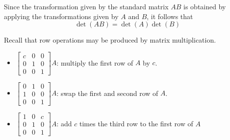 \begin{applicationActivities}
\begin{activity}{5}
\end{activity}

\begin{fact}
Since the transformation given by the standard matrix \(AB\) is obtained
by applying the transformations given by \(A\) and \(B\), it follows that 
\[\det(AB)=\det(A)\det(B)\]
\end{fact}

\begin{remark}
Recall that row operations may be produced by matrix multiplication.
\begin{itemize}
\item \(
  \begin{bmatrix}
  c & 0 & 0 \\
  0 & 1 & 0 \\
  0 & 0 & 1
  \end{bmatrix}A
\): multiply the first row of \(A\) by \(c\).
\item \(
  \begin{bmatrix}
  0 & 1 & 0 \\
  1 & 0 & 0 \\
  0 & 0 & 1
  \end{bmatrix}A
\): swap the first and second row of \(A\).
\item \(
  \begin{bmatrix}
  1 & 0 & c \\
  0 & 1 & 0 \\
  0 & 0 & 1
  \end{bmatrix}A
\): add \(c\) times the third row to the first row of \(A\)
\end{itemize}
\end{remark}



\end{applicationActivities}
